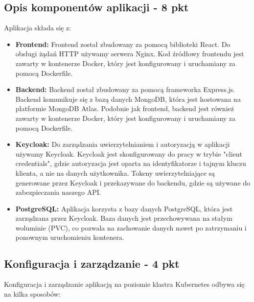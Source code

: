 \documentclass[12pt,a4paper]{article}
\begin{document}
\subsection{Opis komponentów aplikacji - 8 pkt}
\label{sec:FunctionalConditions}

Aplikacja składa się z:

\begin{itemize}
\item \textbf{Frontend:} Frontend został zbudowany za pomocą biblioteki React. Do obsługi żądań HTTP używamy serwera Nginx. Kod źródłowy frontendu jest zawarty w kontenerze Docker, który jest konfigurowany i uruchamiany za pomocą Dockerfile.

\item \textbf{Backend:} Backend został zbudowany za pomocą frameworka Express.js. Backend komunikuje się z bazą danych MongoDB, która jest hostowana na platformie MongoDB Atlas. Podobnie jak frontend, backend jest również zawarty w kontenerze Docker, który jest konfigurowany i uruchamiany za pomocą Dockerfile.

\item \textbf{Keycloak:} Do zarządzania uwierzytelnianiem i autoryzacją w aplikacji używamy Keycloak. Keycloak jest skonfigurowany do pracy w trybie "client credentials", gdzie autoryzacja jest oparta na identyfikatorze i tajnym kluczu klienta, a nie na danych użytkownika. Tokeny uwierzytelniające są generowane przez Keycloak i przekazywane do backendu, gdzie są używane do zabezpieczania naszego API.

\item \textbf{PostgreSQL:} Aplikacja korzysta z bazy danych PostgreSQL, która jest zarządzana przez Keycloak. Baza danych jest przechowywana na stałym woluminie (PVC), co pozwala na zachowanie danych nawet po zatrzymaniu i ponownym uruchomieniu kontenera.
\end{itemize}

\subsection{Konfiguracja i zarządzanie - 4 pkt}
\label{sec:NonFunctionalConditions}

Konfiguracja i zarządzanie aplikacją na poziomie klastra Kubernetes odbywa się na kilka sposobów:
\end{document}
